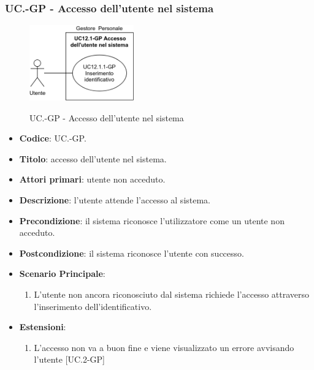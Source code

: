 	\subsubsection{UC\theuccount.\thesubuccount-GP - Accesso dell'utente nel sistema}
		\begin{figure}[H]
			\centering
				\includegraphics[width=0.4\textwidth]{img/casi_d'uso/UC12_1.png}\\
			\caption{UC\theuccount.\thesubuccount-GP - Accesso dell'utente nel sistema}
		\end{figure}
		\begin{itemize}
			\item \textbf{Codice}: UC\theuccount.\thesubuccount-GP.
			\item \textbf{Titolo}: accesso dell'utente nel sistema.
			\item \textbf{Attori primari}: utente non acceduto.
			\item \textbf{Descrizione}: l'utente attende l'accesso al sistema.
			\item \textbf{Precondizione}: il sistema riconosce l'utilizzatore come un utente non acceduto.
			\item \textbf{Postcondizione}: il sistema riconosce l'utente con successo.
			\item \textbf{Scenario Principale}:
			\begin{enumerate}
				\item L’utente non ancora riconosciuto dal sistema richiede l'accesso attraverso l'inserimento dell'identificativo.
			\end{enumerate}
			\item \textbf{Estensioni}:
			\begin{enumerate}
				\item L'accesso non va a buon fine e viene visualizzato un errore avvisando l'utente [UC\theuccount.2-GP]
			\end{enumerate}
		\end{itemize}
		
		\newpage
		
